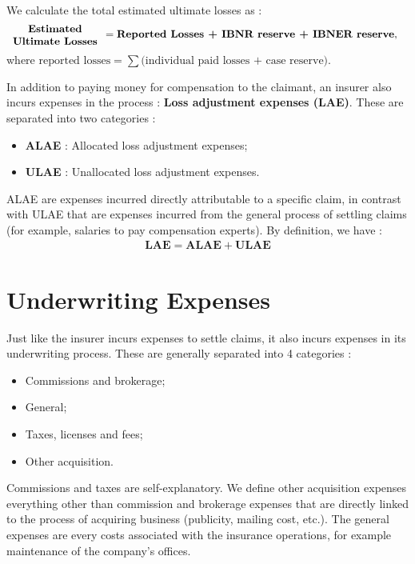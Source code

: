 \documentclass[11pt, english]{memoir}
\numberwithin{definition}{section}
\begin{document}
\begin{tcolorbox}
We calculate the total estimated ultimate losses as : 
\begin{align*}
\begin{minipage}{90pt}
\begin{center}
\textbf{Estimated Ultimate Losses}
\end{center}
\end{minipage}
&= \textbf{Reported Losses + IBNR reserve + IBNER reserve},
\end{align*}
where $\text{reported losses} = \sum\big(\text{individual paid losses + case reserve}\big)$.
\end{tcolorbox}


In addition to paying money for compensation to the claimant, an insurer also incurs expenses in the process : \textbf{Loss adjustment expenses (LAE)}. These are separated into two categories : 
\begin{itemize}
\item \textbf{ALAE} : Allocated loss adjustment expenses;
\item \textbf{ULAE} : Unallocated loss adjustment expenses.
\end{itemize}
ALAE are expenses incurred directly attributable to a specific claim, in contrast with ULAE that are expenses incurred from the general process of settling claims (for example, salaries to pay compensation experts). By definition, we have :
\begin{align*}
\textbf{LAE} = \textbf{ALAE} + \textbf{ULAE}
\end{align*}

\section{Underwriting Expenses}
Just like the insurer incurs expenses to settle claims, it also incurs expenses in its underwriting process. These are generally separated into 4 categories : 
\begin{itemize}
\item Commissions and brokerage;
\item General;
\item Taxes, licenses and fees;
\item Other acquisition.
\end{itemize}

Commissions and taxes are self-explanatory. We define other acquisition expenses everything other than commission and brokerage expenses that are directly linked to the process of acquiring business (publicity, mailing cost, etc.). The general expenses are every costs associated with the insurance operations, for example maintenance of the company's offices. 
\end{document}
